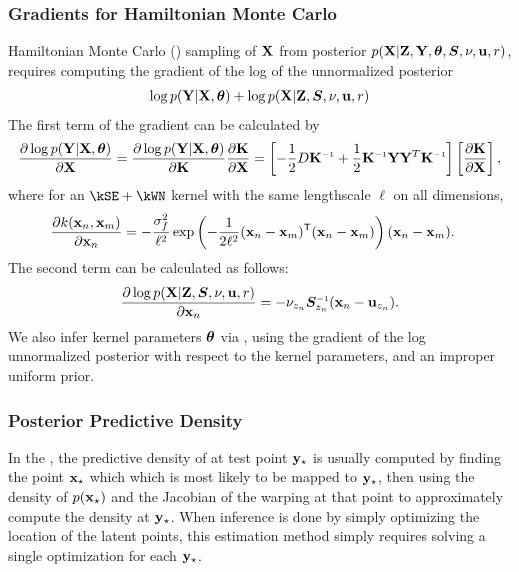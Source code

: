 \subsubsection{Gradients for Hamiltonian Monte Carlo}

Hamiltonian Monte Carlo (\HMC{}) sampling of $\mathbf{X}$ from posterior ${p(\mathbf{X}|\mathbf{Z},\mathbf{Y},\bm{\theta},\bm{S},\nu,{\bf{u}},r)}$, requires computing the gradient of the log of the unnormalized posterior
%
\begin{align}
\log p(\mathbf{Y}|\mathbf{X},\bm{\theta}) + \log p(\mathbf{X}|\mathbf{Z},\bm{S},\nu,{\bf{u}},r)
\end{align}
%
The first term of the gradient can be calculated by
%
\begin{align}
\pderiv{\log p(\vY | \vX,\bm{\theta})}{\vX} =  \pderiv{\log p(\vY | \vX,\bm{\theta})}{\vK} \pderiv{\vK}{\vX} = \left[ -\frac{1}{2}D\vK\inv+\frac{1}{2}\vK\inv \vY \vY^{T} \vK\inv \right]\left[\pderiv{\vK}{\vX}\right], 
\end{align}
%
where for an $\kSE + \kWN$ kernel with the same lengthscale $\ell$ on all dimensions,
%
\begin{align}
\frac{\partial k({\bf{x}}_{n},{\bf{x}}_{m})}{\partial {\bf{x}}_n}
 & = -\frac{\sigma^2_f}{\ell^2} \exp \left( - \frac{1}{2 \ell^2} ({\bf{x}}_n - {\bf{x}}_m)^{\mathsf{T}} ({\bf{x}}_n - {\bf{x}}_m) \right) ({\bf{x}}_n - {\bf{x}}_m).
\end{align}
%
The second term can be calculated as follows:
\begin{align}
\frac{\partial \log p(\vX|\vZ,\bm{S},\nu,\vu,r)}{\partial \vx_{n}} 
= -\nu_{z_{n}}\bm{S}_{z_{n}}\inv(\vx_{n}-\vu_{z_{n}}).
\end{align}
We also infer kernel parameters ${\boldsymbol{\theta}}$ via \HMC{}, using the gradient of the log unnormalized posterior with respect to the kernel parameters, and an improper uniform prior.




\subsubsection{Posterior Predictive Density}
\label{sec:iwmm-predictive-density}

In the \gplvm{}, the predictive density of at test point ${\bf{y}}_\star$ is usually computed by finding the point ${\bf{x}}_\star$ which which is most likely to be mapped to ${\bf{y}}_\star$, then using the density of $p({\bf{x}}_\star)$ and the Jacobian of the warping at that point to approximately compute the density at ${\bf{y}}_\star$.
When inference is done by simply optimizing the location of the latent points, this estimation method simply requires solving a single optimization for each ${\bf{y}}_\star$.  

